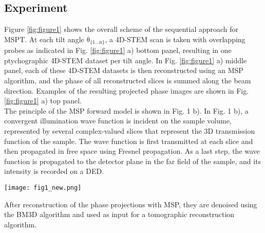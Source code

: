 \documentclass[12pt]{iopart}
\begin{document}
\subsection{Experiment}
Figure \ref{fig:figure1} shows the overall scheme of the sequential approach for MSPT. At each tilt angle $\mathrm{\theta_{\{1 ... n\}}}$, a 4D-STEM scan is taken with overlapping probes as indicated in Fig. \ref{fig:figure1} a) bottom panel, resulting in one ptychographic 4D-STEM dataset per tilt angle. In Fig. \ref{fig:figure1} a) middle panel, each of these 4D-STEM datasets is then reconstructed using an MSP algorithm, and the phase of all reconstructed slices is summed along the beam direction. Examples of the resulting projected phase images are shown in Fig. \ref{fig:figure1} a) top panel.\\
The principle of the MSP forward model is shown in Fig. 1 b). In Fig. 1 b), a convergent illumination wave function is incident on the sample volume, represented by several complex-valued slices that represent the 3D transmission function of the sample. The wave function is first transmitted at each slice and then propagated in free space using Fresnel propagation. As a last step, the wave function is propagated to the detector plane in the far field of the sample, and its intensity is recorded on a DED.
\begin{figure*}[ht!]
\texttt{[image: fig1\_new.png]}
\caption{\label{fig:figure1} Atomic resolution multi-slice ptychographic tomography. a) Scheme of the reconstruction algorithm and tilt-series 4D-STEM measurements. b) schematic of the slicing of the volume along the depth direction c) example image of a projected phase image after reconstruction.}
\end{figure*}
After reconstruction of the phase projections with MSP, they are denoised using the BM3D algorithm \cite{Dabov_Foi_Katkovnik_Egiazarian_2007} and used as input for a tomographic reconstruction algorithm.
\end{document}
